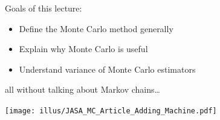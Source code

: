 








Goals of this lecture:
\begin{itemize}
\item Define the Monte Carlo method generally
\item Explain why Monte Carlo is useful
\item Understand variance of Monte Carlo estimators
\end{itemize}
all without talking about Markov chains\ldots

%
%
%
%
%

\newpage

\texttt{[image: illus/JASA\_MC\_Article\_Adding\_Machine.pdf]}
 

%
%   


